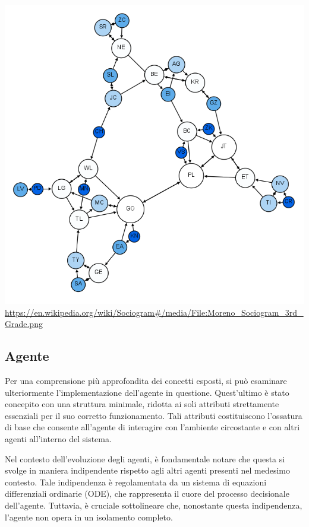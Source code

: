 \begin{minipage}{\linewidth}
    \centering
    \includegraphics[width=\textwidth]{img/Moreno_Sociogram_3rd_Grade.png}
	\url{https://en.wikipedia.org/wiki/Sociogram#/media/File:Moreno_Sociogram_3rd_Grade.png}
    \label{fig:social_graph}
\end{minipage}
\newpage

\subsection{Agente}

Per una comprensione più approfondita dei concetti esposti, 
si può esaminare ulteriormente l'implementazione dell'agente in questione. 
Quest'ultimo è stato concepito con una struttura minimale, 
ridotta ai soli attributi strettamente essenziali per il suo corretto 
funzionamento. Tali attributi costituiscono l'ossatura di base che 
consente all'agente di interagire con l'ambiente circostante e con 
altri agenti all'interno del sistema.

Nel contesto dell'evoluzione degli agenti, è fondamentale notare che 
questa si svolge in maniera indipendente rispetto agli altri agenti 
presenti nel medesimo contesto. Tale indipendenza è regolamentata da un 
sistema di equazioni differenziali ordinarie (ODE), che rappresenta il 
cuore del processo decisionale dell'agente. 
Tuttavia, è cruciale sottolineare che, nonostante questa indipendenza, 
l'agente non opera in un isolamento completo.

